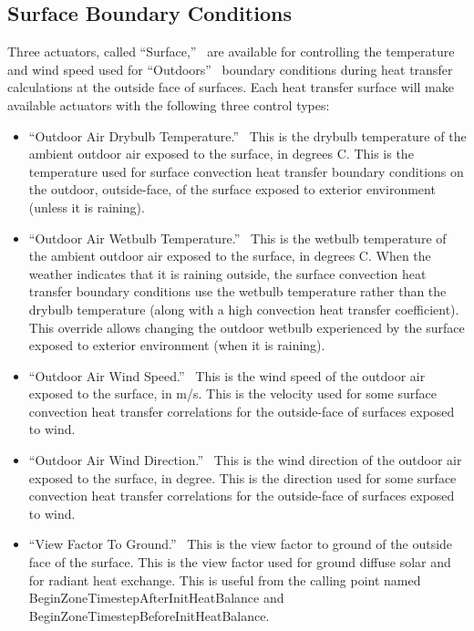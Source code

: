 \subsection{Surface Boundary Conditions}\label{surface-boundary-conditions}

Three actuators, called ``Surface,''~ are available for controlling the temperature and wind speed used for ``Outdoors''~ boundary conditions during heat transfer calculations at the outside face of surfaces. Each heat transfer surface will make available actuators with the following three control types:

\begin{itemize}
\item
  ``Outdoor Air Drybulb Temperature.''~ This is the drybulb temperature of the ambient outdoor air exposed to the surface, in degrees C. This is the temperature used for surface convection heat transfer boundary conditions on the outdoor, outside-face, of the surface exposed to exterior environment (unless it is raining).
\item
  ``Outdoor Air Wetbulb Temperature.''~ This is the wetbulb temperature of the ambient outdoor air exposed to the surface, in degrees C. When the weather indicates that it is raining outside, the surface convection heat transfer boundary conditions use the wetbulb temperature rather than the drybulb temperature (along with a high convection heat transfer coefficient). This override allows changing the outdoor wetbulb experienced by the surface exposed to exterior environment (when it is raining).
\item
  ``Outdoor Air Wind Speed.''~ This is the wind speed of the outdoor air exposed to the surface, in m/s. This is the velocity used for some surface convection heat transfer correlations for the outside-face of surfaces exposed to wind. 
\item
  ``Outdoor Air Wind Direction.''~ This is the wind direction of the outdoor air exposed to the surface, in degree. This is the direction used for some surface convection heat transfer correlations for the outside-face of surfaces exposed to wind.
\item
  ``View Factor To Ground.''~ This is the view factor to ground of the outside face of the surface. This is the view factor used for ground diffuse solar and for radiant heat exchange. This is useful from the calling point named BeginZoneTimestepAfterInitHeatBalance and BeginZoneTimestepBeforeInitHeatBalance.
\end{itemize}

